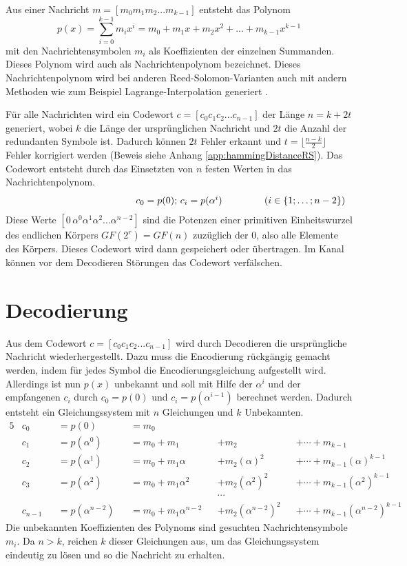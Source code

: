 Aus einer Nachricht  $m=[m_{0}m_{1}m_{2}...m_{k-1}]$ entsteht das Polynom \[p(x)=\sum_{i=0}^{k-1}m_ix^i=m_0+m_1x+m_2x^2+...+m_{k-1}x^{k-1}\] mit den Nachrichtensymbolen $m_i$ als Koeffizienten der einzelnen Summanden.
Dieses Polynom wird auch als Nachrichtenpolynom bezeichnet.
Dieses Nachrichtenpolynom wird bei anderen Reed-Solomon-Varianten auch mit andern Methoden wie zum Beispiel Lagrange-Interpolation generiert \cite{wendlingIntroductionReedSolomon2017}.

Für alle Nachrichten wird ein Codewort $c=[c_{0}c_{1}c_{2}...c_{n-1}]$ der Länge $n=k+2t$ generiert, wobei $k$ die Länge der ursprünglichen Nachricht und $2t$ die Anzahl der redundanten Symbole ist. 
Dadurch können $2t$ Fehler erkannt und $t=\lfloor\frac{n-k}{2}\rfloor$ Fehler korrigiert werden (Beweis siehe Anhang \ref{app:hammingDistanceRS}).
Das Codewort entsteht durch das Einsetzten von $n$ festen Werten in das Nachrichtenpolynom.
\[
\makebox[\linewidth]{%
	\hfill
	$c_0=p(0);\,c_i=p(\alpha^i)$\hfill
	\llap{($i\in\{1;\dots;n-2\}$)}%
}
\]
Diese Werte $[0\,\alpha^0 \alpha^1 \alpha^2...\alpha^{n-2}]$ sind die Potenzen einer primitiven Einheitswurzel des endlichen Körpers $GF(2^r)=GF(n)$ zuzüglich der 0, also alle Elemente des Körpers.
Dieses Codewort wird dann gespeichert oder übertragen.
Im Kanal können vor dem Decodieren Störungen das Codewort verfälschen.

\section{Decodierung}\label{sec:decoding}

Aus dem Codewort $c=[c_{0}c_{1}c_{2}...c_{n-1}]$ wird durch Decodieren die ursprüngliche Nachricht wiederhergestellt.
Dazu muss die Encodierung rückgängig gemacht werden, indem für jedes Symbol die Encodierungsgleichung aufgestellt wird. 
Allerdings ist nun $p(x)$ unbekannt und soll mit Hilfe der $\alpha^i$ und der empfangenen $c_i$ durch $c_0=p(0)$ und $c_i=p(\alpha^{i-1})$ berechnet werden.
Dadurch entsteht ein Gleichungssystem mit $n$ Gleichungen und $k$ Unbekannten.
\begin{alignat}{5}
	&c_0&&=p(0)&&=m_0\nonumber\\
	&c_1&&=p(\alpha^0)&&=m_0+m_1&&+m_2&&+\cdots+m_{k-1}\nonumber\\
	&c_2&&=p(\alpha^1)&&=m_0+m_1 \alpha&&+m_2 (\alpha)^2&&+\cdots+m_{k-1} (\alpha)^{k-1}\nonumber\\
	&c_3&&=p(\alpha^2)&&=m_0+m_1 \alpha^2&&+m_2 (\alpha^2)^2&&+\cdots+m_{k-1} (\alpha^2)^{k-1}\nonumber\\
	&&&&&&&\cdots\nonumber\\
	&c_{n-1}&&=p(\alpha^{n-2})&&=m_0+m_1 \alpha^{n-2}&&+m_2 (\alpha^{n-2})^2&&+\cdots+m_{k-1} (\alpha^{n-2})^{k-1}\nonumber
\end{alignat}
Die unbekannten Koeffizienten des Polynoms sind gesuchten Nachrichtensymbole $m_i$. 
Da $n>k$, reichen $k$ dieser Gleichungen aus, um das Gleichungssystem eindeutig zu lösen und so die Nachricht zu erhalten.


